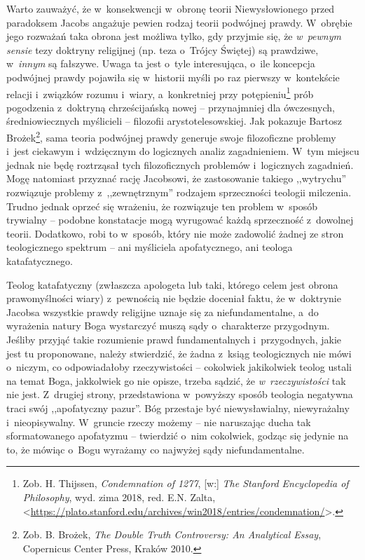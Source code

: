 Warto zauważyć, że w~konsekwencji w~obronę teorii Niewysłowionego przed paradoksem Jacobs angażuje pewien rodzaj teorii podwójnej prawdy. W~obrębie jego rozważań taka obrona jest możliwa tylko, gdy przyjmie się, że \textit{w~pewnym sensie} tezy doktryny religijnej (np. teza o~Trójcy Świętej) są prawdziwe, w~\textit{innym} są fałszywe. Uwaga ta jest o~tyle interesująca, o~ile koncepcja podwójnej prawdy pojawiła się w~historii myśli po raz pierwszy w~kontekście relacji i~związków rozumu i~wiary, a~konkretniej przy potępieniu\footnote{Zob. H. Thijssen, \textit{Condemnation of 1277}, [w:] \textit{The Stanford Encyclopedia of Philosophy}, wyd. zima 2018, red. E.N. Zalta, {\textless}\url{https://plato.stanford.edu/archives/win2018/entries/condemnation/}{\textgreater}.} prób pogodzenia z~doktryną chrześcijańską nowej -- przynajmniej dla ówczesnych, średniowiecznych myślicieli -- filozofii arystotelesowskiej. Jak pokazuje Bartosz Brożek\footnote{Zob. B. Brożek, \textit{The Double Truth Controversy: An Analytical Essay}, Copernicus Center Press, Kraków 2010.}, sama teoria podwójnej prawdy generuje swoje filozoficzne problemy i~jest ciekawym i~wdzięcznym do logicznych analiz zagadnieniem. W~tym miejscu jednak nie będę roztrząsał tych filozoficznych problemów i~logicznych zagadnień. Mogę natomiast przyznać rację Jacobsowi, że zastosowanie takiego ,,wytrychu'' rozwiązuje problemy z~,,zewnętrznym'' rodzajem sprzeczności teologii milczenia. Trudno jednak oprzeć się wrażeniu, że rozwiązuje ten problem w~sposób trywialny -- podobne konstatacje mogą wyrugować każdą sprzeczność z~dowolnej teorii. Dodatkowo, robi to w~sposób, który nie może zadowolić żadnej ze stron teologicznego spektrum -- ani myśliciela apofatycznego, ani teologa katafatycznego.

Teolog katafatyczny (zwłaszcza apologeta lub taki, którego celem jest obrona prawomyślności wiary) z~pewnością nie będzie doceniał faktu, że w~doktrynie Jacobsa wszystkie prawdy religijne uznaje się za niefundamentalne, a~do wyrażenia natury Boga wystarczyć muszą sądy o~charakterze przygodnym. Jeśliby przyjąć takie rozumienie prawd fundamentalnych i~przygodnych, jakie jest tu proponowane, należy stwierdzić, że żadna z~ksiąg teologicznych nie mówi o~niczym, co odpowiadałoby rzeczywistości -- cokolwiek jakikolwiek teolog ustali na temat Boga, jakkolwiek go nie opisze, trzeba sądzić, że \textit{w~rzeczywistości} tak nie jest. Z~drugiej strony, przedstawiona w~powyższy sposób teologia negatywna traci swój ,,apofatyczny pazur''. Bóg przestaje być niewysławialny, niewyrażalny i~nieopisywalny. W~gruncie rzeczy możemy -- nie naruszając ducha tak sformatowanego apofatyzmu -- twierdzić o~nim cokolwiek, godząc się jedynie na to, że mówiąc o~Bogu wyrażamy co najwyżej sądy niefundamentalne.

